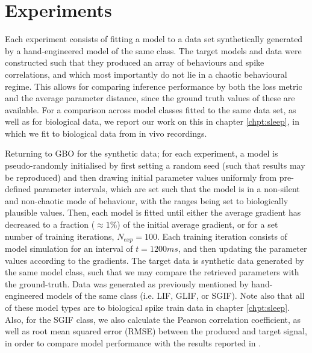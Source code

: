 \documentclass[mphil,deptreport,ianc]{infthesis} %
\begin{document}
\section{Experiments}

Each experiment consists of fitting a model to a data set synthetically generated by a hand-engineered model of the same class.
The target models and data were constructed such that they produced an array of behaviours and spike correlations, and which most importantly do not lie in a chaotic behavioural regime.
This allows for comparing inference performance by both the loss metric and the average parameter distance, since the ground truth values of these are available.
For a comparison across model classes fitted to the same data set, as well as for biological data, we report our work on this in chapter \ref{chpt:sleep}, in which we fit to biological data from in vivo recordings.


Returning to GBO for the synthetic data; for each experiment, a model is pseudo-randomly initialised by first setting a random seed (such that results may be reproduced) and then drawing initial parameter values uniformly from pre-defined parameter intervals, which are set such that the model is in a non-silent and non-chaotic mode of behaviour, with the ranges being set to biologically plausible values.
Then, each model is fitted until either the average gradient has decreased to a fraction ($\approx 1 \%$) of the initial average gradient, or for a set number of training iterations, $N_{exp}=100$.
Each training iteration consists of model simulation for an interval of $t=1200 \si{ms}$, and then updating the parameter values according to the gradients.
The target data is synthetic data generated by the same model class, such that we may compare the retrieved parameters with the ground-truth.
Data was generated as previously mentioned by hand-engineered models of the same class (i.e. LIF, GLIF, or SGIF).
Note also that all of these model types are to biological spike train data in chapter \ref{chpt:sleep}.
Also, for the SGIF class, we also calculate the Pearson correlation coefficient, as well as root mean squared error (RMSE) between the produced and target signal, in order to compare model performance with the results reported in \cite{Rene2020}.
\end{document}
